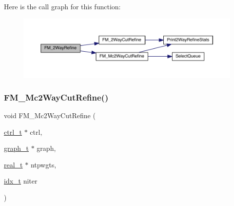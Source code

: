 Here is the call graph for this function\+:\nopagebreak
\begin{figure}[H]
\begin{center}
\leavevmode
\includegraphics[width=350pt]{a00197_a1ffe9ee55eb23e345beb5da3e67c501a_cgraph}
\end{center}
\end{figure}
\mbox{\label{a00197_aaa49d065f964af00512da0c4b3d4cad6}} 
\subsubsection{\texorpdfstring{F\+M\+\_\+\+Mc2\+Way\+Cut\+Refine()}{FM\_Mc2WayCutRefine()}}
{\footnotesize\ttfamily void F\+M\+\_\+\+Mc2\+Way\+Cut\+Refine (\begin{DoxyParamCaption}\item[{\hyperlink{a00742}{ctrl\+\_\+t} $\ast$}]{ctrl,  }\item[{\hyperlink{a00734}{graph\+\_\+t} $\ast$}]{graph,  }\item[{\hyperlink{a00876_a1924a4f6907cc3833213aba1f07fcbe9}{real\+\_\+t} $\ast$}]{ntpwgts,  }\item[{\hyperlink{a00876_aaa5262be3e700770163401acb0150f52}{idx\+\_\+t}}]{niter }\end{DoxyParamCaption})}

